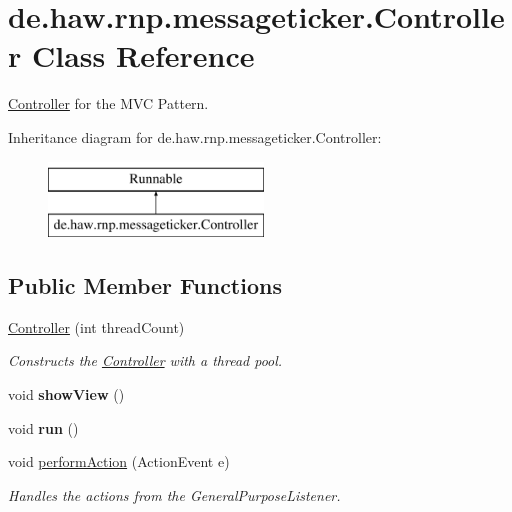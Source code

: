 \hypertarget{classde_1_1haw_1_1rnp_1_1messageticker_1_1Controller}{\section{de.\-haw.\-rnp.\-messageticker.\-Controller Class Reference}
\label{classde_1_1haw_1_1rnp_1_1messageticker_1_1Controller}
}


\hyperlink{classde_1_1haw_1_1rnp_1_1messageticker_1_1Controller}{Controller} for the M\-V\-C Pattern.  


Inheritance diagram for de.\-haw.\-rnp.\-messageticker.\-Controller\-:\begin{figure}[H]
\begin{center}
\leavevmode
\includegraphics[height=2.000000cm]{classde_1_1haw_1_1rnp_1_1messageticker_1_1Controller}
\end{center}
\end{figure}
\subsection*{Public Member Functions}
\begin{DoxyCompactItemize}
\item 
\hyperlink{classde_1_1haw_1_1rnp_1_1messageticker_1_1Controller_ac8e9fae5cb88bfce79183a0083461c83}{Controller} (int thread\-Count)
\begin{DoxyCompactList}\small\item\em Constructs the \hyperlink{classde_1_1haw_1_1rnp_1_1messageticker_1_1Controller}{Controller} with a thread pool. \end{DoxyCompactList}\item 
\hypertarget{classde_1_1haw_1_1rnp_1_1messageticker_1_1Controller_af8a2b3982f049feff0033438cb7e903f}{void {\bfseries show\-View} ()}\label{classde_1_1haw_1_1rnp_1_1messageticker_1_1Controller_af8a2b3982f049feff0033438cb7e903f}

\item 
\hypertarget{classde_1_1haw_1_1rnp_1_1messageticker_1_1Controller_a9af1c749b25a86bccd8ca1082bd1e164}{void {\bfseries run} ()}\label{classde_1_1haw_1_1rnp_1_1messageticker_1_1Controller_a9af1c749b25a86bccd8ca1082bd1e164}

\item 
void \hyperlink{classde_1_1haw_1_1rnp_1_1messageticker_1_1Controller_a3d64a8b1ca98d53d3ee7f8b4585dd306}{perform\-Action} (Action\-Event e)
\begin{DoxyCompactList}\small\item\em Handles the actions from the General\-Purpose\-Listener. \end{DoxyCompactList}\end{DoxyCompactItemize}


